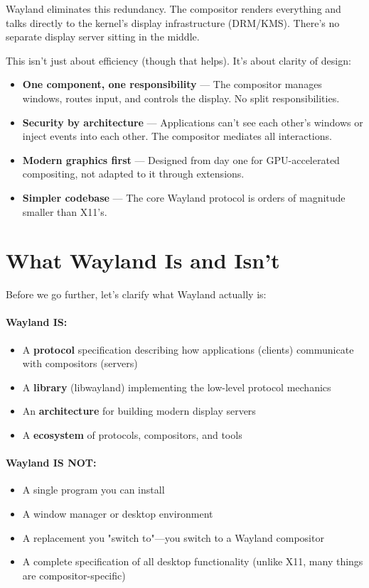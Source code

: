 Wayland eliminates this redundancy. The compositor renders everything and talks directly to the kernel's display infrastructure (DRM/KMS). There's no separate display server sitting in the middle.

This isn't just about efficiency (though that helps). It's about clarity of design:

\begin{itemize}
    \item \textbf{One component, one responsibility} — The compositor manages windows, routes input, and controls the display. No split responsibilities.

    \item \textbf{Security by architecture} — Applications can't see each other's windows or inject events into each other. The compositor mediates all interactions.

    \item \textbf{Modern graphics first} — Designed from day one for GPU-accelerated compositing, not adapted to it through extensions.

    \item \textbf{Simpler codebase} — The core Wayland protocol is orders of magnitude smaller than X11's.
\end{itemize}

\section*{What Wayland Is and Isn't}

Before we go further, let's clarify what Wayland actually is:

\paragraph{Wayland IS:}
\begin{itemize}
    \item A \textbf{protocol} specification describing how applications (clients) communicate with compositors (servers)
    \item A \textbf{library} (libwayland) implementing the low-level protocol mechanics
    \item An \textbf{architecture} for building modern display servers
    \item A \textbf{ecosystem} of protocols, compositors, and tools
\end{itemize}

\paragraph{Wayland IS NOT:}
\begin{itemize}
    \item A single program you can install
    \item A window manager or desktop environment
    \item A replacement you "switch to"—you switch to a Wayland compositor
    \item A complete specification of all desktop functionality (unlike X11, many things are compositor-specific)
\end{itemize}

